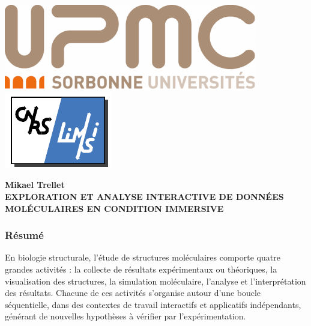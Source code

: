 \backmatter 
\chapter*{}%
\pagestyle{empty}

\setlength{\headheight}{0.pt}
        
\includegraphics[height=1.cm]{./figures/UPMC_these.pdf}\hfill
\includegraphics[height=1.cm]{./figures/limsilogo_vectoriel.pdf}\hfill


\begin{center}
 \textbf{Mikael Trellet} \\
 \textbf{EXPLORATION ET ANALYSE INTERACTIVE DE DONNÉES MOLÉCULAIRES EN CONDITION IMMERSIVE}
\end{center}
    

\footnotesize
\subsection*{Résumé}












\footnotesize
En biologie structurale, l'étude de structures moléculaires comporte quatre grandes activités : la collecte de résultats expérimentaux ou théoriques, la visualisation des structures, la simulation moléculaire, l'analyse et l'interprétation des résultats. Chacune de ces activités s'organise autour d'une boucle séquentielle, dans des contextes de travail interactifs et applicatifs indépendants, générant de nouvelles hypothèses à vérifier par l'expérimentation.

